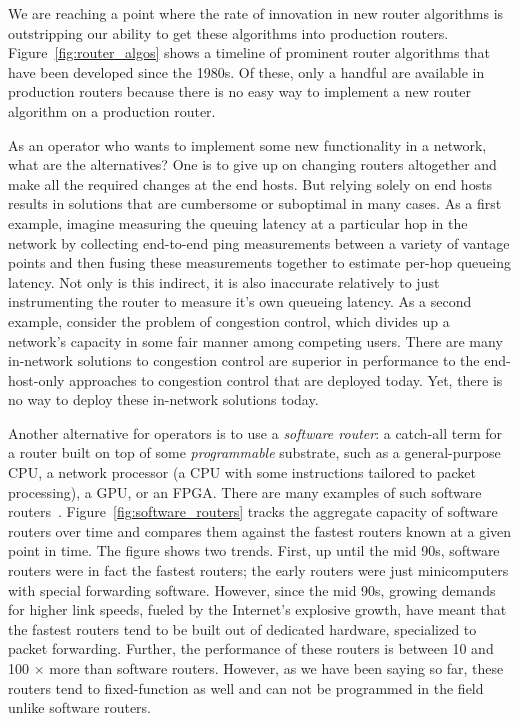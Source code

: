 We are reaching a point where the rate of innovation in new router algorithms
is outstripping our ability to get these algorithms into production routers.
Figure~\ref{fig:router_algos} shows a timeline of prominent router algorithms
that have been developed since the 1980s. Of these, only a handful are
available in production routers because there is no easy way to implement a new
router algorithm on a production router.

As an operator who wants to implement some new functionality in a network, what
are the alternatives? One is to give up on changing routers altogether and make
all the required changes at the end hosts. But relying solely on end hosts
results in solutions that are cumbersome or suboptimal in many cases. As a
first example, imagine measuring the queuing latency at a particular hop in the
network by collecting end-to-end ping measurements between a variety of vantage
points and then fusing these measurements together to estimate per-hop queueing
latency. Not only is this indirect, it is also inaccurate relatively to just
instrumenting the router to measure it's own queueing latency. As a second
example, consider the problem of congestion control, which divides up a
network's capacity in some fair manner among competing users. There are many
in-network solutions to congestion control are superior in performance to the
end-host-only approaches to congestion control that are deployed today. Yet,
there is no way to deploy these in-network solutions today.

Another alternative for operators is to use a \textit{software router}: a
catch-all term for a router built on top of some \textit{programmable}
substrate, such as a general-purpose CPU, a network processor (a CPU with some
instructions tailored to packet processing), a GPU, or an FPGA. There are many
examples of such software routers~\cite{click, routebrucks, netfpga,
packetshader, ixp}. Figure~\ref{fig:software_routers} tracks the aggregate
capacity of software routers over time and compares them against the fastest
routers known at a given point in time. The figure shows two trends. First, up
until the mid 90s, software routers were in fact the fastest routers; the early
routers were just minicomputers with special forwarding software. However,
since the mid 90s, growing demands for higher link speeds, fueled by the
Internet's explosive growth, have meant that the fastest routers tend to be
built out of dedicated hardware, specialized to packet forwarding. Further, the
performance of these routers is between 10 and 100 $\times$ more than software
routers. However, as we have been saying so far, these routers tend to
fixed-function as well and can not be programmed in the field unlike software
routers.

